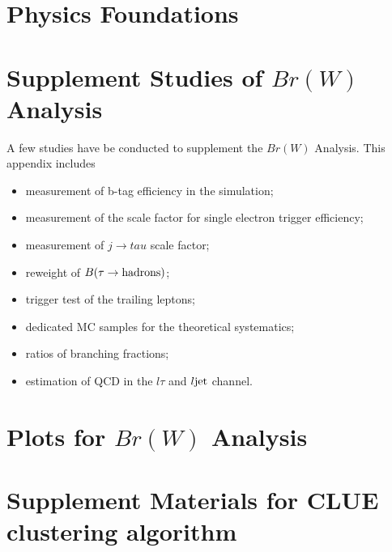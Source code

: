 \chapter{Physics Foundations}





\chapter{Supplement Studies of $Br(W)$ Analysis}

A few studies have be conducted to supplement the $Br(W)$ Analysis.
This appendix includes 
\begin{itemize}
    \item measurement of b-tag efficiency in the simulation;
    \item measurement of the scale factor for single electron trigger efficiency;
    \item measurement of $j \to tau$ scale factor;
    \item reweight of $B(\tau \to  \rm{hadrons})$;
    \item trigger test of the trailing leptons;
    \item dedicated MC samples for the \ttbar theoretical systematics;
    \item ratios of branching fractions;
    \item estimation of QCD in the $l\tau$ and $l\rm{jet}$ channel. 
\end{itemize}















\chapter{Plots for $Br(W)$ Analysis}





\chapter{Supplement Materials for CLUE clustering algorithm}


